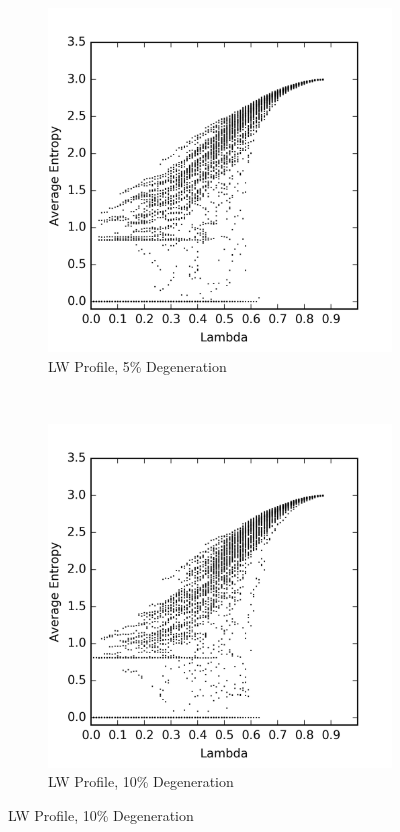 \documentclass[a4paper,11pt]{article}
\begin{document}
\begin{figure}[htp]
\centering
\begin{subfigure}[t]{0.4\textwidth}
  \includegraphics[width=\textwidth]{ch6_figs/degen_stoma_5}
  \caption{LW Profile, 5\% Degeneration}
  \label{fig:lw_degen_pt_5}
\end{subfigure}
~
\begin{subfigure}[t]{0.4\textwidth}
  \centering
  \includegraphics[width=\textwidth]{ch6_figs/degen_stoma_10}
  \caption{LW Profile, 10\% Degeneration}
  \label{fig:lw_degen_pt_10}
  \end{subfigure}


\end{figure}
\end{document}

